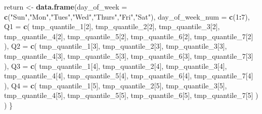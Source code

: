 \documentclass[
]{article}
\newenvironment{Shaded}{\begin{snugshade}}{\end{snugshade}}
\newcommand{\AttributeTok}[1]{\textcolor[rgb]{0.13,0.29,0.53}{#1}}
\newcommand{\DecValTok}[1]{\textcolor[rgb]{0.00,0.00,0.81}{#1}}
\newcommand{\FunctionTok}[1]{\textcolor[rgb]{0.13,0.29,0.53}{\textbf{#1}}}
\newcommand{\NormalTok}[1]{#1}
\newcommand{\OtherTok}[1]{\textcolor[rgb]{0.56,0.35,0.01}{#1}}
\newcommand{\SpecialCharTok}[1]{\textcolor[rgb]{0.81,0.36,0.00}{\textbf{#1}}}
\newcommand{\StringTok}[1]{\textcolor[rgb]{0.31,0.60,0.02}{#1}}
\begin{document}
\begin{Shaded}
\begin{Highlighting}[]
\NormalTok{  return }\OtherTok{\textless{}{-}} \FunctionTok{data.frame}\NormalTok{(}\AttributeTok{day\_of\_week =} \FunctionTok{c}\NormalTok{(}\StringTok{"Sun"}\NormalTok{,}\StringTok{"Mon"}\NormalTok{,}\StringTok{"Tues"}\NormalTok{,}\StringTok{"Wed"}\NormalTok{,}\StringTok{"Thurs"}\NormalTok{,}\StringTok{"Fri"}\NormalTok{,}\StringTok{"Sat"}\NormalTok{),}
                       \AttributeTok{day\_of\_week\_num =} \FunctionTok{c}\NormalTok{(}\DecValTok{1}\SpecialCharTok{:}\DecValTok{7}\NormalTok{),}
                       \AttributeTok{Q1 =} \FunctionTok{c}\NormalTok{(}
\NormalTok{                         tmp\_quantile\_1[}\DecValTok{2}\NormalTok{],}
\NormalTok{                         tmp\_quantile\_2[}\DecValTok{2}\NormalTok{],}
\NormalTok{                         tmp\_quantile\_3[}\DecValTok{2}\NormalTok{],}
\NormalTok{                         tmp\_quantile\_4[}\DecValTok{2}\NormalTok{],}
\NormalTok{                         tmp\_quantile\_5[}\DecValTok{2}\NormalTok{],}
\NormalTok{                         tmp\_quantile\_6[}\DecValTok{2}\NormalTok{],}
\NormalTok{                         tmp\_quantile\_7[}\DecValTok{2}\NormalTok{]}
\NormalTok{                       ),}
                       \AttributeTok{Q2 =} \FunctionTok{c}\NormalTok{(}
\NormalTok{                         tmp\_quantile\_1[}\DecValTok{3}\NormalTok{],}
\NormalTok{                         tmp\_quantile\_2[}\DecValTok{3}\NormalTok{],}
\NormalTok{                         tmp\_quantile\_3[}\DecValTok{3}\NormalTok{],}
\NormalTok{                         tmp\_quantile\_4[}\DecValTok{3}\NormalTok{],}
\NormalTok{                         tmp\_quantile\_5[}\DecValTok{3}\NormalTok{],}
\NormalTok{                         tmp\_quantile\_6[}\DecValTok{3}\NormalTok{],}
\NormalTok{                         tmp\_quantile\_7[}\DecValTok{3}\NormalTok{]}
\NormalTok{                       ),}
                       \AttributeTok{Q3 =} \FunctionTok{c}\NormalTok{(}
\NormalTok{                         tmp\_quantile\_1[}\DecValTok{4}\NormalTok{],}
\NormalTok{                         tmp\_quantile\_2[}\DecValTok{4}\NormalTok{],}
\NormalTok{                         tmp\_quantile\_3[}\DecValTok{4}\NormalTok{],}
\NormalTok{                         tmp\_quantile\_4[}\DecValTok{4}\NormalTok{],}
\NormalTok{                         tmp\_quantile\_5[}\DecValTok{4}\NormalTok{],}
\NormalTok{                         tmp\_quantile\_6[}\DecValTok{4}\NormalTok{],}
\NormalTok{                         tmp\_quantile\_7[}\DecValTok{4}\NormalTok{]}
\NormalTok{                       ),}
                       \AttributeTok{Q4 =} \FunctionTok{c}\NormalTok{(}
\NormalTok{                         tmp\_quantile\_1[}\DecValTok{5}\NormalTok{],}
\NormalTok{                         tmp\_quantile\_2[}\DecValTok{5}\NormalTok{],}
\NormalTok{                         tmp\_quantile\_3[}\DecValTok{5}\NormalTok{],}
\NormalTok{                         tmp\_quantile\_4[}\DecValTok{5}\NormalTok{],}
\NormalTok{                         tmp\_quantile\_5[}\DecValTok{5}\NormalTok{],}
\NormalTok{                         tmp\_quantile\_6[}\DecValTok{5}\NormalTok{],}
\NormalTok{                         tmp\_quantile\_7[}\DecValTok{5}\NormalTok{]}
\NormalTok{                       )}
\NormalTok{                       )}
\NormalTok{\}}


\end{Highlighting}
\end{Shaded}
\end{document}

